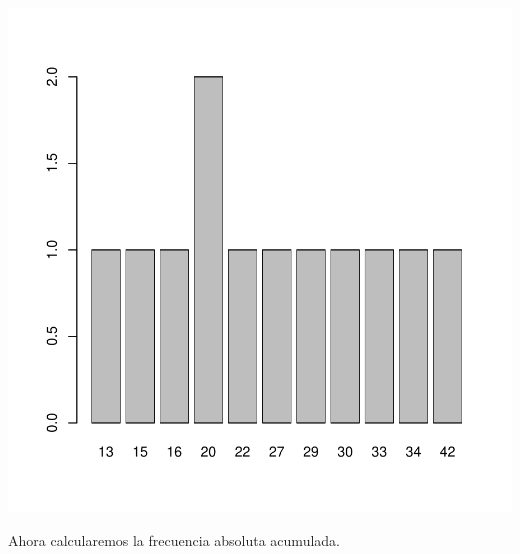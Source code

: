 \documentclass [a4paper] {article}
\begin{document}
\begin{Schunk}
\end{Schunk}
\begin{center}
\includegraphics{entrega-frecuencia_absoluta_satelites_plot}
\end{center}

Ahora calcularemos la frecuencia absoluta acumulada.
\end{document}
